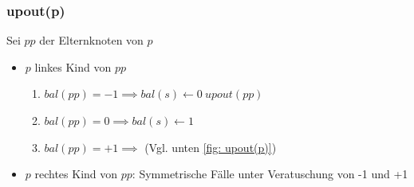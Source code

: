 \documentclass[a4paper]{article}
\begin{document}
\subsubsection*{upout(p)}
Sei $pp$ der Elternknoten von $p$
\begin{itemize}
    \item $p$ linkes Kind von $pp$
        \begin{enumerate}
            \item $bal(pp) = -1 \implies bal(s) \gets 0 \ \textbf{$upout(pp)$}$
            \item $bal(pp) = 0 \implies bal(s) \gets 1 $
            \item $bal(pp) = +1 \implies $ (Vgl. unten \ref{fig: upout(p)})
        \end{enumerate}
    \item $p$ rechtes Kind von $pp$: Symmetrische Fälle unter Veratuschung von -1 und +1
\end{itemize}
\end{document}
